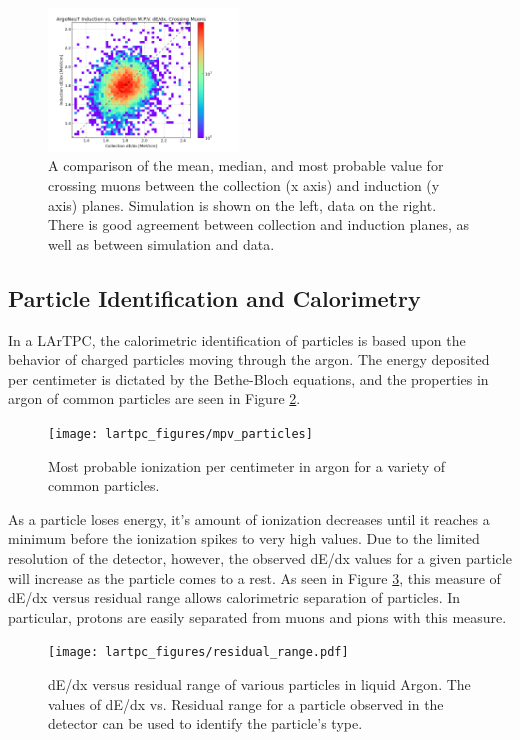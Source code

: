 \begin{figure}[p]
  \includegraphics[width=0.45\textwidth]{lartpc_figures/mpv_coll_vs_ind_data.png}
  \caption[Cross Plane Calibration Checks]{A comparison of the mean, median, and most probable value for crossing muons between the collection (x axis) and induction (y axis) planes.  Simulation is shown on the left, data on the right.  There is good agreement between collection and induction planes, as well as between simulation and data.}
  \label{fig:coll_ind_differences}
\end{figure}

\subsection{Particle Identification and Calorimetry}

In a LArTPC, the calorimetric identification of particles is based upon the behavior of charged particles moving through the argon.  The energy deposited per centimeter is dictated by the Bethe-Bloch equations, and the properties in argon of common particles are seen in Figure \ref{fig:bethe_bloch}.

\begin{figure}[htbp]
  \centering
  \texttt{[image: lartpc\_figures/mpv\_particles]}
  \caption[MPV Ionization in Argon for Common Species of Particles]{Most probable ionization per centimeter in argon for a variety of common particles.}
  \label{fig:bethe_bloch}
\end{figure}

As a particle loses energy, it's amount of ionization decreases until it reaches a minimum before the ionization spikes to very high values.  Due to the limited resolution of the detector, however, the observed dE/dx values for a given particle will increase as the particle comes to a rest.  As seen in Figure \ref{fig:residual_range}, this measure of dE/dx versus residual range allows calorimetric separation of particles.  In particular, protons are easily separated from muons and pions with this measure.

\begin{figure}[tb]
  \centering
  \texttt{[image: lartpc\_figures/residual\_range.pdf]}
  \caption[Residual Range]{dE/dx versus residual range of various particles in liquid Argon.  The values of dE/dx vs. Residual range for a particle observed in the detector can be used to identify the particle's type.}
  \label{fig:residual_range}
\end{figure}

